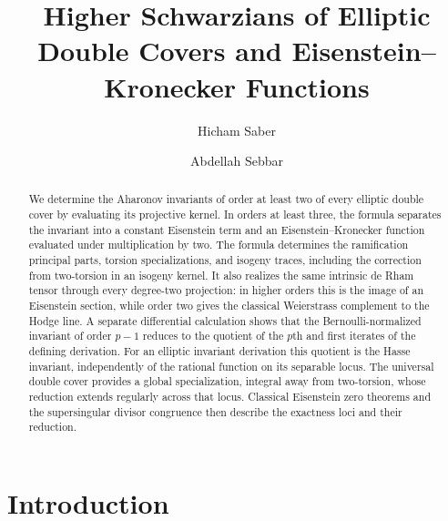 \documentclass[11pt]{amsart}
\theoremstyle{definition}
\theoremstyle{remark}
\numberwithin{equation}{section}
\begin{document}
\title[Higher Schwarzians of elliptic double covers]{Higher Schwarzians of Elliptic Double Covers and Eisenstein--Kronecker Functions}
\author{Hicham Saber}
\author{Abdellah Sebbar}
\address{Department of Mathematics, University of Ha'il, Saudi Arabia}
\address{Department of Mathematics and Statistics, University of Ottawa, Ottawa, Ontario K1N 6N5, Canada}


\begin{abstract}
We determine the Aharonov invariants of order at least two of every
elliptic double cover by evaluating its projective kernel. In orders
at least three, the formula separates the invariant into a constant
Eisenstein term and an Eisenstein--Kronecker function evaluated under
multiplication by two.
The formula determines the ramification principal parts, torsion
specializations, and isogeny traces, including the correction from
two-torsion in an isogeny kernel. It also realizes the same intrinsic
de Rham tensor through every degree-two projection: in higher orders
this is the image of an Eisenstein section, while order two gives the
classical Weierstrass complement to the Hodge line. A separate
differential calculation shows that the Bernoulli-normalized invariant
of order $p-1$ reduces to the quotient of the $p$th and first iterates
of the defining derivation. For an elliptic invariant derivation this
quotient is the Hasse invariant, independently of the rational function
on its separable locus. The universal double cover provides a global
specialization, integral away from two-torsion, whose reduction extends
regularly across that locus. Classical Eisenstein zero theorems and
the supersingular divisor congruence then describe the exactness
loci and their reduction.
\end{abstract}

\maketitle

\section{Introduction}
\end{document}
